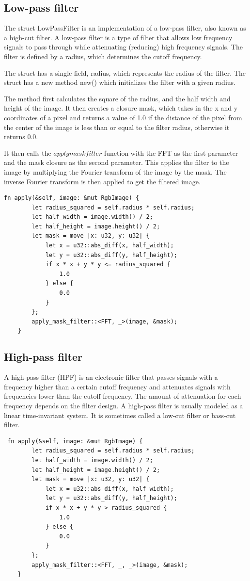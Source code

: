 \documentclass[12pt]{article}
\begin{document}
\subsection{Low-pass filter}
The struct LowPassFilter is an implementation of a low-pass filter, also known as a high-cut filter. A low-pass filter is a type of filter that allows low frequency signals to pass through while attenuating (reducing) high frequency signals. The filter is defined by a radius, which determines the cutoff frequency.

The struct has a single field, radius, which represents the radius of the filter. The struct has a new method new() which initializes the filter with a given radius.

The method first calculates the square of the radius, and the half width and height of the image. It then creates a closure mask, which takes in the x and y coordinates of a pixel and returns a value of 1.0 if the distance of the pixel from the center of the image is less than or equal to the filter radius, otherwise it returns 0.0.

It then calls the $apply mask filter$ function with the FFT as the first parameter and the mask closure as the second parameter. This applies the filter to the image by multiplying the Fourier transform of the image by the mask. The inverse Fourier transform is then applied to get the filtered image.

\begin{lstlisting}
fn apply(&self, image: &mut RgbImage) {
        let radius_squared = self.radius * self.radius;
        let half_width = image.width() / 2;
        let half_height = image.height() / 2;
        let mask = move |x: u32, y: u32| {
            let x = u32::abs_diff(x, half_width);
            let y = u32::abs_diff(y, half_height);
            if x * x + y * y <= radius_squared {
                1.0
            } else {
                0.0
            }
        };
        apply_mask_filter::<FFT, _>(image, &mask);
    }
\end{lstlisting}
\subsection{High-pass filter}
A high-pass filter (HPF) is an electronic filter that passes signals with a frequency higher than a certain cutoff frequency and attenuates signals with frequencies lower than the cutoff frequency. The amount of attenuation for each frequency depends on the filter design. A high-pass filter is usually modeled as a linear time-invariant system. It is sometimes called a low-cut filter or bass-cut filter.
\begin{lstlisting}
 fn apply(&self, image: &mut RgbImage) {
        let radius_squared = self.radius * self.radius;
        let half_width = image.width() / 2;
        let half_height = image.height() / 2;
        let mask = move |x: u32, y: u32| {
            let x = u32::abs_diff(x, half_width);
            let y = u32::abs_diff(y, half_height);
            if x * x + y * y > radius_squared {
                1.0
            } else {
                0.0
            }
        };
        apply_mask_filter::<FFT, _, _>(image, &mask);
    }
\end{lstlisting}
\end{document}
